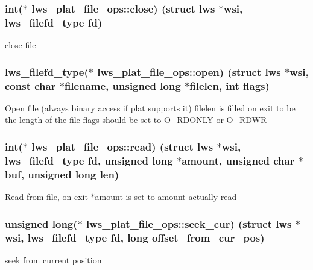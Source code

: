 \subsubsection[{\texorpdfstring{close}{close}}]{\setlength{\rightskip}{0pt plus 5cm}int($\ast$ lws\+\_\+plat\+\_\+file\+\_\+ops\+::close) (struct lws $\ast$wsi, lws\+\_\+filefd\+\_\+type fd)}\hypertarget{structlws__plat__file__ops_a034ec96f2fbaf52b4aa3e82d20795f7b}{}\label{structlws__plat__file__ops_a034ec96f2fbaf52b4aa3e82d20795f7b}
close file 
\subsubsection[{\texorpdfstring{open}{open}}]{\setlength{\rightskip}{0pt plus 5cm}lws\+\_\+filefd\+\_\+type($\ast$ lws\+\_\+plat\+\_\+file\+\_\+ops\+::open) (struct lws $\ast$wsi, const char $\ast$filename, unsigned long $\ast$filelen, int flags)}\hypertarget{structlws__plat__file__ops_ad37a97abc68d0af967cef874f4d8df32}{}\label{structlws__plat__file__ops_ad37a97abc68d0af967cef874f4d8df32}
Open file (always binary access if plat supports it) filelen is filled on exit to be the length of the file flags should be set to O\+\_\+\+R\+D\+O\+N\+LY or O\+\_\+\+R\+D\+WR 
\subsubsection[{\texorpdfstring{read}{read}}]{\setlength{\rightskip}{0pt plus 5cm}int($\ast$ lws\+\_\+plat\+\_\+file\+\_\+ops\+::read) (struct lws $\ast$wsi, lws\+\_\+filefd\+\_\+type fd, unsigned long $\ast$amount, unsigned char $\ast$buf, unsigned long len)}\hypertarget{structlws__plat__file__ops_a01f483807a9862736b17ba9ed5110c40}{}\label{structlws__plat__file__ops_a01f483807a9862736b17ba9ed5110c40}
Read from file, on exit $\ast$amount is set to amount actually read 
\subsubsection[{\texorpdfstring{seek\+\_\+cur}{seek\_cur}}]{\setlength{\rightskip}{0pt plus 5cm}unsigned long($\ast$ lws\+\_\+plat\+\_\+file\+\_\+ops\+::seek\+\_\+cur) (struct lws $\ast$wsi, lws\+\_\+filefd\+\_\+type fd, long offset\+\_\+from\+\_\+cur\+\_\+pos)}\hypertarget{structlws__plat__file__ops_abfcda19b003dcc13c61ff9e2bb4ff869}{}\label{structlws__plat__file__ops_abfcda19b003dcc13c61ff9e2bb4ff869}
seek from current position 
